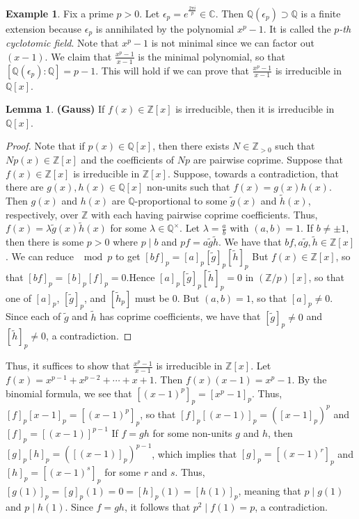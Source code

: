 \documentclass[10pt,letterpaper,cm]{nupset}
\theoremstyle{definition}
\newtheorem{exmp}{Example}
\newtheorem{lemma}{Lemma}
\newcommand{\C}{\mathbb C}
\newcommand{\Q}{\mathbb Q}
\newcommand{\Z}{\mathbb Z}
\newcommand{\1}{\mathbf{1}}
\newcommand{\0}{\vec 0}
\begin{document}
\begin{exmp} 
 Fix a prime $p>0$. Let $\epsilon_p = e^{\frac{2\pi i}{p}} \in \C$. Then $\Q(\epsilon_p) \supset \Q$ is a finite extension because $\epsilon_p$ is annihilated by the polynomial $x^p-1$. It is called the \textit{$p$-th cyclotomic field}. Note that $x^p-1$ is not minimal since we can factor out $(x-1)$. We claim that $\frac{x^p-1}{x-1}$ is the minimal polynomial, so that $[\Q(\epsilon_p) : \Q] =p-1$. This will hold if we can prove that $\frac{x^p-1}{x-1}$ is irreducible in $\Q[x]$. 
\begin{lemma}{\textbf{(Gauss)}}
If $f(x) \in \Z[x]$ is irreducible, then it is irreducible in $\Q[x]$.
\end{lemma}
\begin{proof}
Note that if $p(x) \in \Q[x]$, then there exists $N \in \Z_{>0}$ such that $N p(x) \in \Z[x]$ and the coefficients  of $Np$ are pairwise coprime. Suppose that $f(x) \in \Z[x]$ is irreducible in $\Z[x]$. Suppose, towards a contradiction, that  there are $g(x), h(x)\in \Q[x]$ non-units such that $f(x) = g(x)h(x)$. Then $g(x)$ and $h(x)$ are $\Q$-proportional to some $\tilde{g}(x)$ and $\tilde{h}(x)$, respectively, over $\Z$ with each having pairwise coprime coefficients. Thus, $f(x) = \lambda \tilde{g}(x)\tilde{h}(x)$ for some $\lambda \in \Q^{\times}$. Let $\lambda = \frac{a}{b}$ with $(a,b)=1$. If $b \ne \pm 1$, then there is some $p>0$ where $p \mid b$ and $pf = a \tilde{g}\tilde{h}$. We have that $bf, a \tilde{g}, \tilde{h} \in \Z[x]$. We can reduce $\mod p$ to get $[bf]_p = [a]_p[\tilde{g}]_p[\tilde{h}]_p$ But $f(x) \in \Z[x]$, so that $[bf]_p  = [b]_p[f]_p =0$.Hence $[a]_p[\tilde{g}]_p[\tilde{h}]_p =0$ in $(\Z/p)[x]$, so that one of $[a]_p$, $[\tilde{g}]_p$, and $[\tilde{h}_p]$ must be $0$. But $(a,b) =1$, so that $[a]_p \ne 0$. Since each of $\tilde{g}$ and $\tilde{h}$ has coprime coefficients, we have that $[\tilde{g}]_p \ne 0$ and $[\tilde{h}]_p \ne 0$, a contradiction. 
\end{proof}
Thus, it suffices to show that $\frac{x^p-1}{x-1}$  is irreducible in $\Z[x]$. Let $f(x) = x^{p-1} + x^{p-2} + \cdots + x + 1$. Then $f(x) (x-1) = x^p-1$. By the binomial formula, we see that $[(x-1)^p]_p = [x^p-1]_p$. Thus, $[f]_p[x-1]_p = [(x-1)^p]_p$, so that $[f]_p[(x-1)]_p = ([x-1]_p)^p$ and $[f]_p = [(x-1)]^{p-1}$ If $f=gh$ for some non-units $g$ and $h$, then $[g]_p[h]_p = ([(x-1)]_p)^{p-1}$, which implies that $[g]_p = [(x-1)^r]_p$ and $[h]_p = [(x-1)^s]_p$ for some $r$ and $s$. Thus, $[g(1)]_p = [g]_p(1) = 0 = [h]_p(1)= [h(1)]_p$, meaning that $p\mid g(1)$ and $p\mid h(1)$. Since $f=gh$, it follows that $p^2 \mid f(1) =p$, a contradiction.
\end{exmp}
\end{document}
